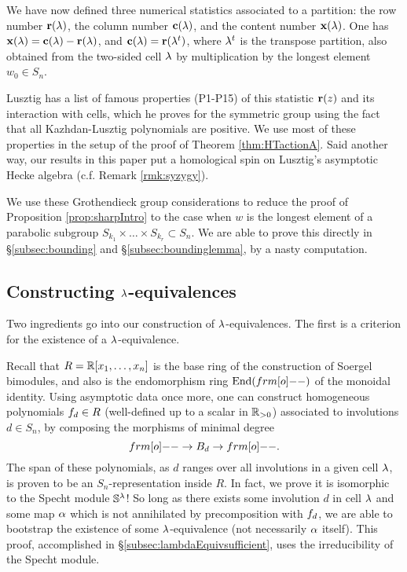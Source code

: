 \begin{remark} We have now defined three numerical statistics associated to a partition: the row number $\mathbf{r}(\lambda)$, the column number $\mathbf{c}(\lambda)$, and the content number $\mathbf{x}(\lambda)$. One
has $\mathbf{x}(\lambda) = \mathbf{c}(\lambda) - \mathbf{r}(\lambda)$, and $\mathbf{c}(\lambda) = \mathbf{r}(\lambda^t)$, where $\lambda^t$ is the transpose partition, also obtained from the two-sided cell $\lambda$ by multiplication by the longest
element $w_0 \in S_n$. \end{remark}

Lusztig \cite[Chapter 14]{LuszUnequal14} has a list of famous properties (P1-P15) of this statistic $\mathbf{r}(z)$ and its interaction with cells, which he proves for the symmetric group
using the fact that all Kazhdan-Lusztig polynomials are positive. We use most of these properties in the setup of the proof of Theorem \ref{thm:HTactionA}. Said another way, our results
in this paper put a homological spin on Lusztig's asymptotic Hecke algebra (c.f. Remark \ref{rmk:syzygy}).

We use these Grothendieck group considerations to reduce the proof of Proposition \ref{prop:sharpIntro} to the case when $w$ is the longest element of a parabolic subgroup $S_{k_1}
\times \ldots \times S_{k_r} \subset S_n$. We are able to prove this directly in \S\ref{subsec:bounding} and \S\ref{subsec:boundinglemma}, by a nasty computation.

\subsection{Constructing $\lambda$-equivalences}
\label{subsec:constructionIntro}

Two ingredients go into our construction of $\lambda$-equivalences. The first is a criterion for the existence of a $\lambda$-equivalence.

Recall that $R = {\mathbb{R}}[x_1, \ldots, x_n]$ is the base ring of the construction of Soergel bimodules, and also is the endomorphism ring $\End(\one)$ of the monoidal identity. Using
asymptotic data once more, one can construct homogeneous polynomials $f_{d} \in R$ (well-defined up to a scalar in ${\mathbb{R}}_{>0}$) associated to involutions $d \in S_n$, by composing the
morphisms of minimal degree \[\one \to B_d \to \one.\] The span of these polynomials, as $d$ ranges over all involutions in a given cell $\lambda$, is proven to be an $S_n$-representation
inside $R$. In fact, we prove it is isomorphic to the Specht module ${\mathbb{S}}^\lambda$! So long as there exists some involution $d$ in cell $\lambda$ and some map $\alpha$ which is not annihilated by
precomposition with $f_{d}$, we are able to bootstrap the existence of some $\lambda$-equivalence (not necessarily $\alpha$ itself). This proof, accomplished in
\S\ref{subsec:lambdaEquivsufficient}, uses the irreducibility of the Specht module.

